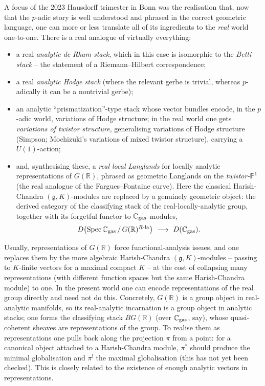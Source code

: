 A focus of the 2023 Hausdorff trimester in Bonn was the realisation that, now
that the $p$-adic story is well understood and phrased in the correct geometric
language, one can more or less translate all of its ingredients to the
\emph{real} world one-to-one. There is a real analogue of virtually everything:
\begin{itemize}
\item a real \emph{analytic de Rham stack}, which in this case is isomorphic to
the \emph{Betti stack} -- the statement of a Riemann--Hilbert correspondence;
\item a real \emph{analytic Hodge stack} (where the relevant gerbe is trivial,
whereas $p$-adically it can be a nontrivial gerbe);
\item an analytic ``prismatization''-type stack whose vector bundles encode, in
the $p$-adic world, variations of Hodge structure; in the real world one gets
\emph{variations of twistor structure}, generalising variations of Hodge
structure (Simpson; Mochizuki's variations of mixed twistor structure), carrying
a $U(1)$-action;
\item and, synthesising these, a \emph{real local Langlands} for locally
analytic representations of $G(\mathbb R)$, phrased as geometric Langlands on the
\emph{twistor-$\mathbb P^1$} (the real analogue of the Fargues--Fontaine curve).
Here the classical Harish-Chandra $(\mathfrak g,K)$-modules are replaced by a
genuinely geometric object: the derived category of the classifying stack of the
real-locally-analytic group, together with its forgetful functor to
$\mathbb C_{\mathrm{gas}}$-modules,
\begin{equation*}
D\bigl(\operatorname{Spec}\mathbb C_{\gasx}\,/\,G(\mathbb R)^{R\text{-}\mathrm{la}}\bigr)\ \longrightarrow\ D(\mathbb C_{\gasx}).
\end{equation*}
\end{itemize}

\begin{remark}
\label{rmk:24:real-reps}
Usually, representations of $G(\mathbb R)$ force functional-analysis issues, and
one replaces them by the more algebraic Harish-Chandra
$(\mathfrak g,K)$-modules -- passing to $K$-finite vectors for a maximal compact
$K$ -- at the cost of collapsing many representations (with different function
spaces but the same Harish-Chandra module) to one. In the present world one can
encode representations of the real group directly and need not do this. Concretely,
$G(\mathbb R)$ is a group object in real-analytic manifolds, so its
real-analytic incarnation is a group object in analytic stacks; one forms the
classifying stack $BG(\mathbb R)$ (over $\mathbb C_{\mathrm{gas}}$, say), whose
quasi-coherent sheaves are representations of the group. To realise them as
representations one pulls back along the projection $\pi$ from a point: for a
canonical object attached to a Harish-Chandra module, $\pi^*$ should produce the
minimal globalisation and $\pi^!$ the maximal globalisation (this has not yet
been checked). This is closely related to the existence of enough analytic
vectors in representations.
\end{remark}


